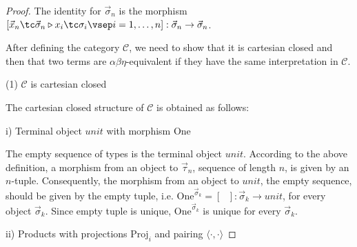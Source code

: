 \begin{proof}
The identity for $ \vec{\sigma}_n $ is the morphism $ [ \vec{x}_n \tc \vec{\sigma}_n \triangleright x_i \tc \sigma_i \vsep i = 1, \ldots , n ] : \vec{\sigma}_n \to \vec{\sigma}_n $.

After defining the category $ \mathcal{C} $, we need to show that it is cartesian closed and then that two terms are $ \alpha \beta \eta $-equivalent if they have the same interpretation in $ \mathcal{C} $.

(1) $ \mathcal{C} $ is cartesian closed

The cartesian closed structure of $ \mathcal{C} $ is obtained as follows:

\textrm{i}) Terminal object $ unit $ with morphism $ \text{One} $

The empty sequence of types is the terminal object $ unit $. According to the above definition, a morphism from an object to $ \vec{\tau}_n $, sequence of length $ n $, is given by an $ n $-tuple. Consequently, the morphism from an object to $ unit $, the empty sequence, should be given by the empty tuple, i.e. $ \text{One}^{\vec{\sigma}_k} = [\text{ }]: \vec{\sigma}_k \to unit $, for every object $ \vec{\sigma}_k $. Since empty tuple is unique, $ \text{One}^{\vec{\sigma}_k} $ is unique for every $ \vec{\sigma}_k $.

\textrm{ii}) Products with projections $ \text{Proj}_i $ and pairing $ \langle \cdot , \cdot \rangle $


\end{proof}
